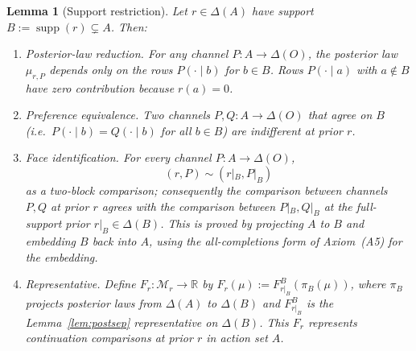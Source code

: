\documentclass[11pt,a4paper]{article}
\newtheorem{lemma}[theorem]{Lemma}
\theoremstyle{definition}
\newcommand{\R}{\mathbb R}
\newcommand{\1}{\mathbf 1}
\begin{document}
\begin{lemma}[Support restriction]\label{lem:supprestrict}
Let $r\in\Delta(A)$ have support $B:=\operatorname{supp}(r)\subsetneq A$.  Then:
\begin{enumerate}
\item[(i)] \emph{Posterior-law reduction.}  For any channel $P:A\to\Delta(O)$, the posterior law $\mu_{r,P}$ depends only
on the rows $P(\cdot\mid b)$ for $b\in B$.  Rows $P(\cdot\mid a)$ with $a\notin B$ have zero contribution because $r(a)=0$.
\item[(ii)] \emph{Preference equivalence.}  Two channels $P,Q:A\to\Delta(O)$ that agree on $B$ (i.e.\ $P(\cdot\mid b)=Q(\cdot\mid b)$
for all $b\in B$) are indifferent at prior $r$.
\item[(iii)] \emph{Face identification.}  For every channel $P:A\to\Delta(O)$,
\[
(r,P)\sim(r|_B,P|_B)
\]
as a two-block comparison; consequently the comparison between channels $P,Q$ at prior $r$ agrees with the comparison
between $P|_B,Q|_B$ at the full-support prior $r|_B\in\Delta(B)$.  This is proved by projecting $A$ to $B$ and embedding
$B$ back into $A$, using the all-completions form of Axiom~\textup{(A5)} for the embedding.
\item[(iv)] \emph{Representative.}  Define $F_r:\mathcal M_r\to\R$ by $F_r(\mu):=F_{r|_B}^B(\pi_B(\mu))$, where $\pi_B$
projects posterior laws from $\Delta(A)$ to $\Delta(B)$ and $F_{r|_B}^B$ is the Lemma~\ref{lem:postsep} representative
on $\Delta(B)$.  This $F_r$ represents continuation comparisons at prior $r$ in action set $A$.
\end{enumerate}
\end{lemma}
\end{document}
